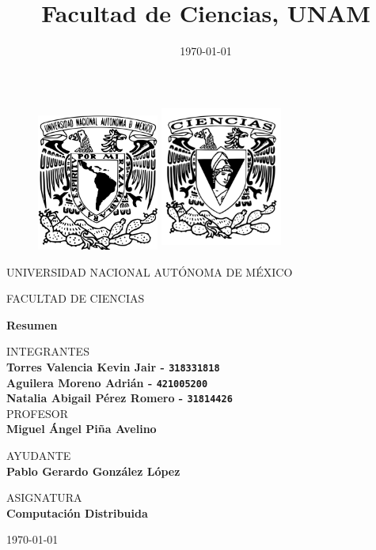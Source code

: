 \documentclass{article}
\title{Facultad de Ciencias, UNAM}
\date{\today}
\begin{document}
\thispagestyle{empty}

	\begin{figure}[ht]
			\includegraphics[width=4cm]{Logo_UNAM.png}
			\label{EscudoUNAM}
	   \endminipage
			\includegraphics[height = 4.9cm ,width=4cm]{Logo_FC.png}
			\label{EscudoFC}
		\endminipage
	\end{figure}

	\begin{center}
	\vspace{0.8cm}
	\LARGE
	UNIVERSIDAD NACIONAL AUTÓNOMA DE MÉXICO

	\vspace{0.7cm}
	\LARGE
	FACULTAD DE CIENCIAS

	\vspace{0.8 cm}
	\Large
	\textbf{Resumen}

	\vspace{0.8 cm}
	\normalsize
	INTEGRANTES \\
	\vspace{.2cm}
	\large
	\textbf{Torres Valencia Kevin Jair - \texttt{318331818}}\\
        \textbf{Aguilera Moreno Adrián - \texttt{421005200}}\\
        \textbf{Natalia Abigail Pérez Romero  - \texttt{31814426}}\\

	\vspace{1 cm}
	\normalsize
	PROFESOR \\
	\vspace{.2cm}
	\large
	\textbf{Miguel Ángel Piña Avelino}

	\vspace{1 cm}
	AYUDANTE \\
	\vspace{.2cm}
	\large
	\textbf{Pablo Gerardo González López}
	\vspace{1.3cm}

	\normalsize
	ASIGNATURA \\
	\vspace{.2cm}
	\large
	\textbf{Computación Distribuida}

	\vspace{1 cm}
	\today
	\end{center}

	\newpage
	
        
\end{document}

